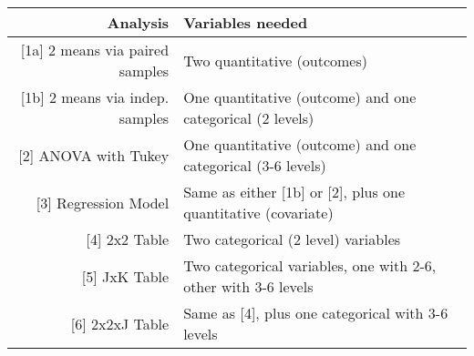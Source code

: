 \documentclass[]{book}
\theoremstyle{definition}
\theoremstyle{definition}
\theoremstyle{definition}
\theoremstyle{remark}
\begin{document}
\begin{longtable}[]{@{}rl@{}}
\toprule
\begin{minipage}[b]{0.31\columnwidth}\raggedleft
Analysis\strut
\end{minipage} & \begin{minipage}[b]{0.63\columnwidth}\raggedright
Variables needed\strut
\end{minipage}\tabularnewline
\midrule
\endhead
\begin{minipage}[t]{0.31\columnwidth}\raggedleft
{[}1a{]} 2 means via paired samples\strut
\end{minipage} & \begin{minipage}[t]{0.63\columnwidth}\raggedright
Two quantitative (outcomes)\strut
\end{minipage}\tabularnewline
\begin{minipage}[t]{0.31\columnwidth}\raggedleft
{[}1b{]} 2 means via indep. samples\strut
\end{minipage} & \begin{minipage}[t]{0.63\columnwidth}\raggedright
One quantitative (outcome) and one categorical (2 levels)\strut
\end{minipage}\tabularnewline
\begin{minipage}[t]{0.31\columnwidth}\raggedleft
{[}2{]} ANOVA with Tukey\strut
\end{minipage} & \begin{minipage}[t]{0.63\columnwidth}\raggedright
One quantitative (outcome) and one categorical (3-6 levels)\strut
\end{minipage}\tabularnewline
\begin{minipage}[t]{0.31\columnwidth}\raggedleft
{[}3{]} Regression Model\strut
\end{minipage} & \begin{minipage}[t]{0.63\columnwidth}\raggedright
Same as either {[}1b{]} or {[}2{]}, plus one quantitative
(covariate)\strut
\end{minipage}\tabularnewline
\begin{minipage}[t]{0.31\columnwidth}\raggedleft
{[}4{]} 2x2 Table\strut
\end{minipage} & \begin{minipage}[t]{0.63\columnwidth}\raggedright
Two categorical (2 level) variables\strut
\end{minipage}\tabularnewline
\begin{minipage}[t]{0.31\columnwidth}\raggedleft
{[}5{]} JxK Table\strut
\end{minipage} & \begin{minipage}[t]{0.63\columnwidth}\raggedright
Two categorical variables, one with 2-6, other with 3-6 levels\strut
\end{minipage}\tabularnewline
\begin{minipage}[t]{0.31\columnwidth}\raggedleft
{[}6{]} 2x2xJ Table\strut
\end{minipage} & \begin{minipage}[t]{0.63\columnwidth}\raggedright
Same as {[}4{]}, plus one categorical with 3-6 levels\strut
\end{minipage}\tabularnewline
\bottomrule
\end{longtable}
\end{document}
